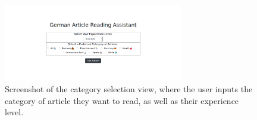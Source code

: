 \begin{figure}
	\caption[Screenshot of the Category Selection View]{Screenshot of the category selection view, where the user inputs the category of article they want to read, as well as their experience level.}
	\label{fig:view1}
	\begin{center}
	\includegraphics[width=0.7\textwidth]{Graphics/View1}
	\end{center}
\end{figure}